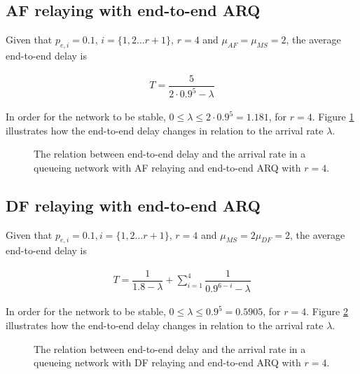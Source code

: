 \subsection{AF relaying with end-to-end ARQ}
Given that $p_{e,i} = 0.1$, $i = \{1,2 \dots r+1\}$, $r=4$ and
$\mu_{AF} = \mu_{MS} = 2$, the average end-to-end delay is

\begin{align}
  T = \dfrac{5}{2 \cdot 0.9^5 - \lambda}
  \label{eq:05_T_af_e2e}
\end{align}

In order for the network to be stable,
$0 \leq \lambda \leq 2 \cdot 0.9^5 = 1.181$, for $r=4$. Figure
\ref{fig:05_arrival_rate_af_e2e} illustrates how the end-to-end delay changes
in relation to the arrival rate $\lambda$.

\begin{figure}\centering
  
  \caption{The relation between end-to-end delay and the arrival rate in a
    queueing network with AF relaying and end-to-end ARQ with $r=4$.}
  \label{fig:05_arrival_rate_af_e2e}
\end{figure}


\subsection{DF relaying with end-to-end ARQ}

Given that $p_{e,i} = 0.1, i = \{1,2 \dots r+1\}$, $r=4$ and
$\mu_{MS} = 2\mu_{DF} = 2$, the average end-to-end delay is

\begin{align}
  T = \dfrac{1}{1.8 - \lambda} + \sum\limits_{i=1}^4 \dfrac{1}{0.9^{6-i} - \lambda}
  \label{eq:05_T_df_e2e}
\end{align}


In order for the network to be stable,
$0 \leq \lambda \leq 0.9^5 = 0.5905$, for $r=4$. Figure
\ref{fig:05_arrival_rate_df_e2e} illustrates how the end-to-end delay changes in
relation to the arrival rate $\lambda$.


\begin{figure}\centering
  
  \caption{The relation between end-to-end delay and the arrival rate in a
    queueing network with DF relaying and end-to-end ARQ with $r=4$.}
  \label{fig:05_arrival_rate_df_e2e}
\end{figure}


